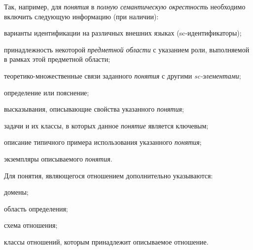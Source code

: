 \begin{SCn}
{Так, например, для \textit{понятия} в \textit{полную семантическую окрестность} необходимо включить следующую информацию (при наличии):
\begin{scnitemize}
    \item варианты идентификации на различных внешних языках (sc-идентификаторы);
    \item принадлежность некоторой \textit{предметной области} с указанием роли, выполняемой в рамках этой предметной области;
    \item теоретико-множественные связи заданного \textit{понятия} с другими \textit{sc-элементами};
    \item определение или пояснение;
    \item высказывания, описывающие свойства указанного \textit{понятия};
    \item задачи и их классы, в которых данное \textit{понятие} является ключевым;
    \item описание типичного примера использования указанного \textit{понятия};
    \item экземпляры описываемого \textit{понятия}.
\end{scnitemize}
Для понятия, являющегося отношением дополнительно указываются:
\begin{scnitemize}
    \item домены;
    \item область определения;
    \item схема отношения;
    \item классы отношений, которым принадлежит описываемое отношение.
\end{scnitemize}
}

\end{SCn}
